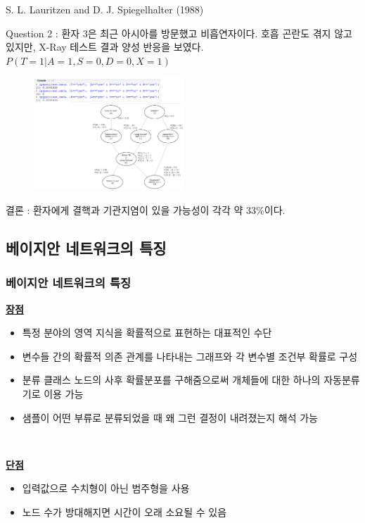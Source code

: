 \documentclass{beamer}
\begin{document}
\begin{frame}{S. L. Lauritzen and D. J. Spiegelhalter (1988)}

{\scriptsize{}Question 2 : 환자 3은 최근 아시아를 방문했고 비흡연자이다. 호흡 곤란도 겪지 않고 있지만, X-Ray 테스트 결과 양성 반응을 보였다. $P(T=1 | A=1, S=0, D=0, X=1)$}

	\begin{figure}
		\includegraphics[height=120pt]{images/image86}
	\end{figure}

{\scriptsize{}결론 : 환자에게 결핵과 기관지염이 있을 가능성이 각각 약 33\%이다.}

\end{frame}



\subsection{베이지안 네트워크의 특징}

\begin{frame}
\frametitle{베이지안 네트워크의 특징}
{\scriptsize{}

	\underline{\textbf{장점}}

	\begin{itemize}

		\item 특정 분야의 영역 지식을 확률적으로 표현하는 대표적인 수단
		
		\item 변수들 간의 확률적 의존 관계를 나타내는 그래프와 각 변수별 조건부 확률로 구성
		
		\item 분류 클래스 노드의 사후 확률분포를 구해줌으로써 개체들에 대한 하나의 자동분류기로 이용 가능
		
		\item 샘플이 어떤 부류로 분류되었을 때 왜 그런 결정이 내려졌는지 해석 가능

	\end{itemize}

	{}\


	\underline{\textbf{단점}}

	\begin{itemize}

		\item 입력값으로 수치형이 아닌 범주형을 사용
		
		\item 노드 수가 방대해지면 시간이 오래 소요될 수 있음		
		
	\end{itemize}
}
\end{frame}
\end{document}
